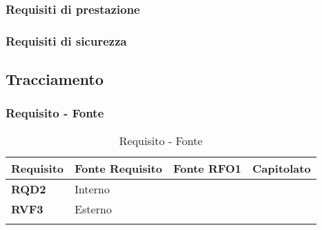 \subsubsection{Requisiti di prestazione}

\subsubsection{Requisiti di sicurezza}

\pagebreak
\subsection{Tracciamento}
\subsubsection{Requisito - Fonte}
\begin{longtable}{|>{\centering\arraybackslash}m{}|>{\centering\arraybackslash}m{}|}
	\hline
	\textbf{Requisito} & \textbf{Fonte} 
	\endfirsthead
	\hline
	\textbf{Requisito} & \textbf{Fonte} 
	\endhead
	\hline
	\textbf{RFO1}            & Capitolato    
	\\\hline
    \textbf{RQD2}            & Interno
    \\\hline
    \textbf{RVF3}            & Esterno
    \\\hline
	\caption{Requisito - Fonte}
\end{longtable}


